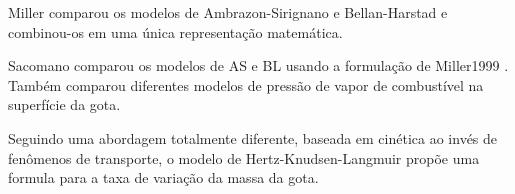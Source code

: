 Miller  comparou os modelos de Ambrazon-Sirignano e Bellan-Harstad e combinou-os em uma única representação matemática.

Sacomano  comparou os modelos de AS e BL usando a formulação de Miller1999 . 
Também comparou diferentes modelos de pressão de vapor de combustível na superfície da gota.

Seguindo uma abordagem totalmente diferente, baseada em cinética ao invés de fenômenos de transporte, o modelo de Hertz-Knudsen-Langmuir  propõe uma formula para a taxa de variação da massa da gota.

